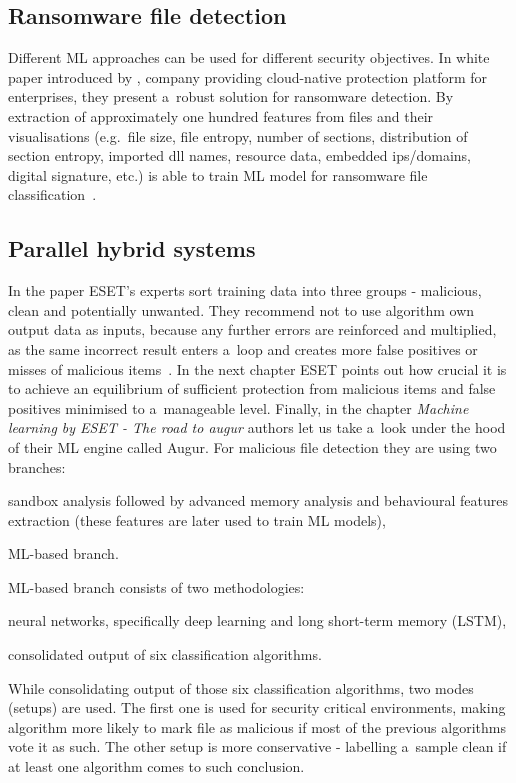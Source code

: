 \subsection{Ransomware file detection}\label{subsec:ransomware-file-detection}

Different ML approaches can be used for different security objectives.
In white paper introduced by \crowdstrike, company providing cloud-native protection platform for enterprises, they present a~robust solution for ransomware detection.
By extraction of approximately one hundred features from files and their visualisations (e.g.\ file size, file entropy, number of sections, distribution of section entropy, imported \acrfull{dll} names, resource data, embedded \acrshort{ips}/domains, digital signature, etc.) is \crowdstrike able to train ML model for ransomware file classification~\cite{crowdstrike_machine_learning}.



\subsection{Parallel hybrid systems}\label{subsec:parallel-hybrid-systems}

In the paper  ESET's experts sort training data into three groups - malicious, clean and potentially unwanted.
They recommend not to use algorithm own output data as inputs, because any further errors are reinforced and multiplied, as the same incorrect result enters a~loop and creates more false positives or misses of malicious items~\cite{eset_machine_learning}.
In the next chapter ESET points out how crucial it is to achieve an equilibrium of sufficient protection from malicious items and false positives minimised to a~manageable level.
Finally, in the chapter \textit{Machine learning by ESET - The road to augur} authors let us take a~look under the hood of their ML engine called Augur.
For malicious file detection they are using two branches:
\begin{enumerate*}[label=(\roman*)]
    \item sandbox analysis followed by advanced memory analysis and behavioural features extraction (these features are later used to train ML models),
    \item ML-based branch.
\end{enumerate*}
ML-based branch consists of two methodologies:
\begin{enumerate*}[label=(\roman*)]
    \item neural networks, specifically deep learning and long short-term memory (LSTM),

    \item consolidated output of six classification algorithms.
\end{enumerate*}
While consolidating output of those six classification algorithms, two modes (setups) are used.
The first one is used for security critical environments, making algorithm more likely to mark file as malicious if most of the previous algorithms vote it as such.
The other setup is more conservative - labelling a~sample clean if at least one algorithm comes to such conclusion.

